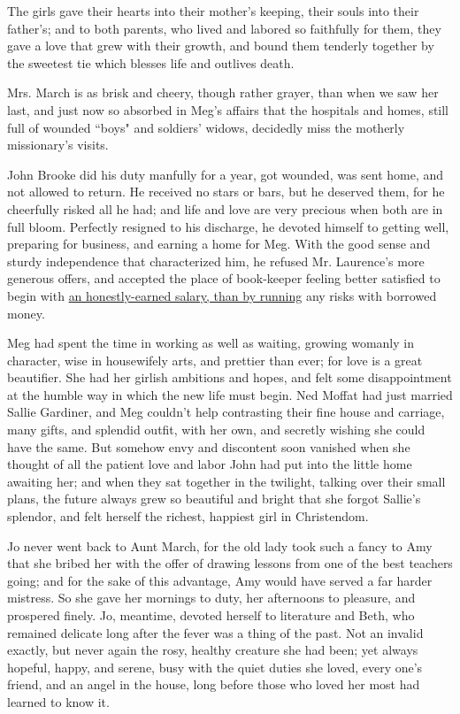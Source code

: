 The girls gave their hearts into their mother's keeping,
their souls into their father's; and to both parents,
who lived and labored so faithfully for them, they gave a love that grew
with their growth, and bound them tenderly together by the sweetest tie
which blesses life and outlives death.

Mrs. March is as brisk and cheery, though rather grayer, than when we
saw her last, and just now so absorbed in Meg's affairs
that the hospitals and homes, still full of wounded ``boys" and
soldiers' widows, decidedly miss the motherly
missionary's visits.

John Brooke did his duty manfully for a year, got wounded, was sent
home, and not allowed to return. He received no stars or bars, but he
deserved them, for he cheerfully risked all he had; and life and love
are very precious when both are in full bloom. Perfectly resigned to his
discharge, he devoted himself to getting well, preparing for business,
and earning a home for Meg. With the good sense and sturdy independence
that characterized him, he refused Mr. Laurence's more
generous offers, and accepted the place of book-keeper feeling better
satisfied to begin with \underline{an honestly-earned salary, than by running}
any risks with borrowed money.

Meg had spent the time in working as well as waiting, growing womanly in
character, wise in housewifely arts, and prettier than ever; for love is
a great beautifier. She had her girlish ambitions and hopes, and felt
some disappointment at the humble way in which the new life must begin.
Ned Moffat had just married Sallie Gardiner, and Meg
couldn't help contrasting their fine house and carriage,
many gifts, and splendid outfit, with her own, and secretly wishing she
could have the same. But somehow envy and discontent soon vanished when
she thought of all the patient love and labor John had put into the
little home awaiting her; and when they sat together in the twilight,
talking over their small plans, the future always grew so beautiful and
bright that she forgot Sallie's splendor, and felt
herself the richest, happiest girl in Christendom.

Jo never went back to Aunt March, for the old lady took such a fancy to
Amy that she bribed her with the offer of drawing lessons from one of
the best teachers going; and for the sake of this advantage, Amy would
have served a far harder mistress. So she gave her mornings to duty, her
afternoons to pleasure, and prospered finely. Jo, meantime, devoted
herself to literature and Beth, who remained delicate long after the
fever was a thing of the past. Not an invalid exactly, but never again
the rosy, healthy creature she had been; yet always hopeful, happy, and
serene, busy with the quiet duties she loved, every
one's friend, and an angel in the house, long before
those who loved her most had learned to know it.

